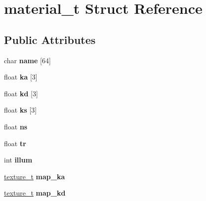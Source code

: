 \hypertarget{structmaterial__t}{}\section{material\+\_\+t Struct Reference}
\label{structmaterial__t}
\subsection*{Public Attributes}
\begin{DoxyCompactItemize}
\item 
\mbox{\label{structmaterial__t_a5bab301dbd2757ee6dbfd4c04b79972e}} 
char {\bfseries name} \mbox{[}64\mbox{]}
\item 
\mbox{\label{structmaterial__t_a622229134dade64b11f093a3b3d82a09}} 
float {\bfseries ka} \mbox{[}3\mbox{]}
\item 
\mbox{\label{structmaterial__t_abfea30046ca46fd5c969020437a5bf36}} 
float {\bfseries kd} \mbox{[}3\mbox{]}
\item 
\mbox{\label{structmaterial__t_a50652a2a1bad3ba8b6e4dbe5cbf8f1cd}} 
float {\bfseries ks} \mbox{[}3\mbox{]}
\item 
\mbox{\label{structmaterial__t_a622edbec2381f80712638562eb890b71}} 
float {\bfseries ns}
\item 
\mbox{\label{structmaterial__t_a05c41f5e91feb9b02ae3de4d0dacb6c3}} 
float {\bfseries tr}
\item 
\mbox{\label{structmaterial__t_a2655dc81fe7a2bae3b2c85bf8c8a58f4}} 
int {\bfseries illum}
\item 
\mbox{\label{structmaterial__t_a4fb7f75acae7227154756e24596716f9}} 
\mbox{\hyperlink{structtexture__t}{texture\+\_\+t}} {\bfseries map\+\_\+ka}
\item 
\mbox{\label{structmaterial__t_af14aa2131eb9c421488276a118362dde}} 
\mbox{\hyperlink{structtexture__t}{texture\+\_\+t}} {\bfseries map\+\_\+kd}
\item 

\end{DoxyCompactItemize}
